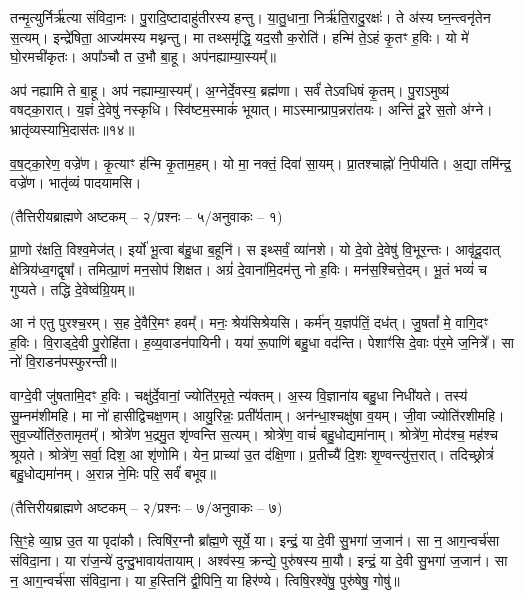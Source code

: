 तन्मृ॒त्युर्निर्\mbox{}ऋ॑त्या संविदा॒नः।
पु॒रादि॒ष्टादाहु॑तीरस्य हन्तु।
या॒तु॒धाना॒ निर्\mbox{}ऋ॑ति॒रादु॒रक्षः॑।
ते अ॑स्य घ्न॒न्त्वनृ॑तेन स॒त्यम्।
इन्द्रे॑षिता॒ आज्य॑मस्य मथ्नन्तु।
मा तथ्समृ॑द्धि॒ यद॒सौ क॒रोति॑।
हन्मि॑ ते॒ऽहं कृ॒तꣳ ह॒विः।
यो मे॑ घो॒रमची॑कृतः।
अपा᳚ञ्चौ त उ॒भौ बा॒हू।
अप॑नह्याम्या॒स्यम्᳚॥

अप॑ नह्यामि ते बा॒हू।
अप॑ नह्याम्या॒स्यम्᳚।
अ॒ग्नेर्दे॒वस्य॒ ब्रह्म॑णा।
सर्वं॑ तेऽवधिषं कृ॒तम्।
पु॒राऽमुष्य॑ वषट्का॒रात्।
य॒ज्ञं दे॒वेषु॑ नस्कृधि।
स्वि॑ष्टम॒स्माकं॑ भूयात्।
माऽस्मान्प्राप॒न्न\-रा॑तयः।
अन्ति॑ दू॒रे स॒तो अ॑ग्ने।
भ्रातृ॑व्यस्याभि॒दास॑तः॥१४॥

व॒ष॒ट्का॒रेण॒ वज्रे॑ण।
कृ॒त्याꣳ ह॑न्मि कृ॒ताम॒हम्।
यो मा॒ नक्तं॒ दिवा॑ सा॒यम्।
प्रा॒तश्चाह्नो॑ नि॒पीय॑ति।
अ॒द्या तमि॑न्द्र॒ वज्रे॑ण।
भातृ॑व्यं पादयामसि।

\centerline{\scriptsize (तैत्तिरीयब्राह्मणे अष्टकम् – २/प्रश्नः – ५/अनुवाकः – १)}

प्रा॒णो र॑क्षति॒ विश्व॒मेज॑त्।
इर्यो॑ भू॒त्वा ब॑हु॒धा ब॒हूनि॑।
स इथ्सर्वं॒ व्या॑नशे।
यो दे॒वो दे॒वेषु॑ वि॒भूर॒न्तः।
आवृ॑दू॒दात् क्षेत्रिय॑ध्व॒गद्वृषा᳚।
तमित्प्रा॒णं मन॒सोप॑ शिक्षत।
अग्रं॑ दे॒वाना॑मि॒दम॑त्तु नो ह॒विः।
मन॑स॒श्चित्ते॒दम्।
भू॒तं भव्यं॑ च गुप्यते।
तद्धि दे॒वेष्व॑ग्रि॒यम्॥

आ न॑ एतु पुरश्च॒रम्।
स॒ह दे॒वैरि॒मꣳ हवम्᳚।
मनः॒ श्रेय॑सिश्रेयसि।
कर्म॑न् य॒ज्ञप॑तिं॒ दध॑त्।
जु॒षतां᳚ मे॒ वागि॒दꣳ ह॒विः।
वि॒राड्दे॒वी पु॒रोहि॑ता।
ह॒व्य॒वाडन॑पायिनी।
यया॑ रू॒पाणि॑ बहु॒धा वद॑न्ति।
पेशाꣳ॑सि दे॒वाः प॑र॒मे ज॒नित्रे᳚।
सा नो॑ वि॒राडन॑पस्फुरन्ती॥

वाग्दे॒वी जु॑षतामि॒दꣳ ह॒विः।
चक्षु॑र्दे॒वानां॒ ज्योति॑र॒मृते॒ न्य॑क्तम्।
अ॒स्य वि॒ज्ञाना॑य बहु॒धा निधी॑यते।
तस्य॑ सु॒म्नम॑शीमहि।
मा नो॑ हासीद्विचक्ष॒णम्।
आयु॒रिन्नः॒ प्रती᳚र्यताम्।
अन॑न्धा॒श्चक्षु॑षा व॒यम्।
जी॒वा ज्योति॑रशीमहि।
सुव॒र्ज्योति॑रु॒तामृतम्᳚।
श्रोत्रे॑ण भ॒द्रमु॒त शृ॑ण्वन्ति स॒त्यम्।
श्रोत्रे॑ण॒ वाचं॑ बहु॒धोद्यमा॑नाम्।
श्रोत्रे॑ण॒ मोद॑श्च॒ मह॑श्च श्रूयते।
श्रोत्रे॑ण॒ सर्वा॒ दिश॒ आ शृ॑णोमि।
येन॒ प्राच्या॑ उ॒त द॑क्षि॒णा।
प्र॒तीच्यै॑ दि॒शः शृ॒ण्वन्त्यु॑त्त॒रात्।
तदिच्छ्रोत्रं॑ बहु॒धोद्यमा॑नम्।
अ॒रान्न ने॒मिः परि॒ सर्वं॑ बभूव॥

\centerline{\scriptsize (तैत्तिरीयब्राह्मणे अष्टकम् – २/प्रश्नः – ७/अनुवाकः – ७)}
सि॒ꣳ॒हे व्या॒घ्र उ॒त या पृदा॑कौ।
त्विषि॑र॒ग्नौ ब्रा᳚ह्म॒णे सूर्ये॒ या।
इन्द्रं॒ या दे॒वी सु॒भगा॑ ज॒जान॑।
सा न॒ आग॒न्वर्च॑सा संविदा॒ना।
या रा॑ज॒न्ये॑ दुन्दु॒भावाय॑तायाम्।
अश्व॑स्य॒ क्रन्द्ये॒ पुरु॑षस्य मा॒यौ।
इन्द्रं॒ या दे॒वी सु॒भगा॑ ज॒जान॑।
सा न॒ आग॒न्वर्च॑सा संविदा॒ना।
या ह॒स्तिनि॑ द्वी॒पिनि॒ या हिर॑ण्ये।
त्विषि॒रश्वे॑षु॒ पुरु॑षेषु॒ गोषु॑॥

